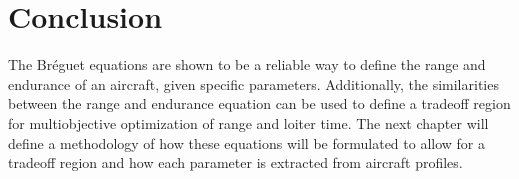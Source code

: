 \section{Conclusion}
The Br\'eguet equations are shown to be a reliable way to define the range and endurance of an aircraft, given specific parameters. Additionally, the similarities between the range and endurance equation can be used to define a tradeoff region for multiobjective optimization of range and loiter time. The next chapter will define a methodology of how these equations will be formulated to allow for a tradeoff region and how each parameter is extracted from aircraft profiles.